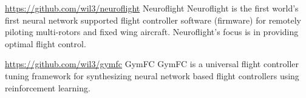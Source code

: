 

\begin{cventries}
  \cvproject
    {\href{https://github.com/wil3/neuroflight}{https://github.com/wil3/neuroflight}} %
    {Neuroflight} %
    {} %
    {} %
    {
Neuroflight is the first world's first neural network supported flight
controller software (firmware) for remotely piloting multi-rotors and fixed
wing aircraft. Neuroflight's focus is in providing optimal flight control.
    }


  \cvproject
    {\href{https://github.com/wil3/gymfc}{https://github.com/wil3/gymfc}} %
    {GymFC} %
    {} %
    {} %
    {
GymFC is a universal flight controller tuning framework for synthesizing neural
network based flight controllers using reinforcement learning.
    }

\end{cventries}
